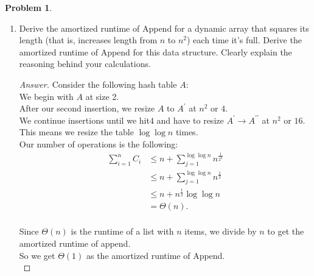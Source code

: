 \documentclass[11pt]{article}
\theoremstyle{definition}
\theoremstyle{definition}
\newtheorem{required}{Problem}
\theoremstyle{definition}
\begin{document}
\begin{required}
\begin{enumerate}
\begin{proof}[Answer]
    Our number of operations is the following: \begin{align*}
    	\displaystyle\sum_{i=1} ^{n} C_i &\leq n + \displaystyle\sum_{j=1} ^{\frac{n - 1}{7}} 7j\\
    	&\leq n + \frac{1}{14}(n - 1)(n + 6)\\
    	&= \Theta(n^2).\\
    \end{align*}
Since $\Theta(n^2)$ is the runtime of a list with $n$ items, we divide by $n$ to get the amortized runtime of append.\\
So we get $\Theta(n)$ as the amortized runtime of Append.\\

    
    \end{proof}

\newpage
\subsection*{27(b)}
    \item \label{4b} Derive the amortized runtime of Append for a dynamic array that squares its length (that is, increases length from $n$ to $n^2$) each time it's full. Derive the amortized runtime of Append for this data structure. Clearly explain the reasoning behind your calculations.
\begin{proof}[Answer]
    Consider the following hash table $A$:\\
    We begin with $A$ at size 2.\\
    After our second insertion, we resize $A$ to  $A^\prime$ at $n^2$ or $4$.\\
    We continue insertions until we hit$4$ and have to resize $A^\prime \to A^{\prime\prime}$ at $n^2$ or $16$.\\
    This means we resize the table $\log \log n$ times.\\
    
    
    
    Our number of operations is the following: \begin{align*}
    	\displaystyle\sum_{i=1} ^{n} C_i &\leq n + \displaystyle\sum_{j=1} ^{\log \log n} n^{\frac{1}{2^k}}\\
    	&\leq n + \displaystyle\sum_{j=1} ^{\log \log n} n^{\frac{1}{2}}\\
    	&\leq n + n^{\frac{1}{2}}\log \log n\\
    	&= \Theta(n).\\
    \end{align*}

	Since $\Theta(n)$ is the runtime of a list with $n$ items, we divide by $n$ to get the amortized runtime of append.\\
	So we get $\Theta(1)$ as the amortized runtime of Append.\\
    \end{proof}
    
    \end{enumerate}
    \end{required}
\end{document}
